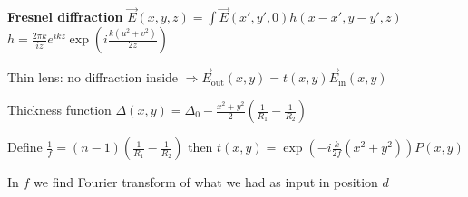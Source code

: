\begin{squishlist}
    \item \textbf{Fresnel diffraction} $\vec{E}(x,y,z) = \int \vec{E}(x',y',0) h(x-x', y-y', z)$ \\
    $h = \frac{2\pi k}{iz} e^{ikz} \exp \left(i \frac{k(u^2 + v^2)}{2z}\right)$
\end{squishlist}
\begin{squishlist}
    \item Thin lens: no diffraction inside $ \Rightarrow \vec{E}_{\text{out}}(x,y) = t(x,y) \vec{E}_{\text{in}}(x,y)$
    \item Thickness function $\Delta(x,y) = \Delta_0 - \frac{x^2 + y^2}{2} \left( \frac{1}{R_1} - \frac{1}{R_2} \right)$
    \item Define $\frac{1}{f} = (n-1) \left( \frac{1}{R_1} - \frac{1}{R_2} \right)$ then $t(x,y) = \exp(-i \frac{k}{2f}(x^2 + y^2)) P(x,y)$
    \item In $f$ we find Fourier transform of what we had as input in position $d$
\end{squishlist}